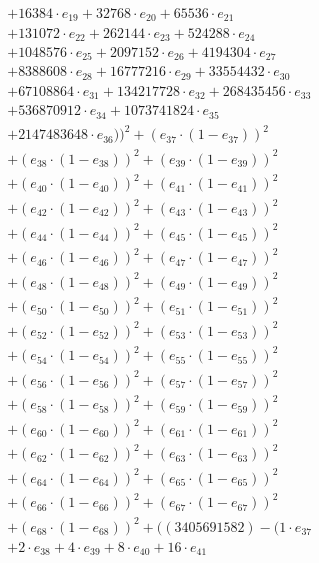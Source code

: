 \documentclass[10pt, a4paper]{article}
\begin{document}
\begin{align*}
& + 16384 \cdot e_{19} + 32768 \cdot e_{20} + 65536 \cdot e_{21} \\
& + 131072 \cdot e_{22} + 262144 \cdot e_{23} + 524288 \cdot e_{24} \\
& + 1048576 \cdot e_{25} + 2097152 \cdot e_{26} + 4194304 \cdot e_{27} \\
& + 8388608 \cdot e_{28} + 16777216 \cdot e_{29} + 33554432 \cdot e_{30} \\
& + 67108864 \cdot e_{31} + 134217728 \cdot e_{32} + 268435456 \cdot e_{33} \\
& + 536870912 \cdot e_{34} + 1073741824 \cdot e_{35} \\
& + 2147483648 \cdot e_{36}))^{2} + (e_{37} \cdot (1 - e_{37}))^{2} \\
& + (e_{38} \cdot (1 - e_{38}))^{2} + (e_{39} \cdot (1 - e_{39}))^{2} \\
& + (e_{40} \cdot (1 - e_{40}))^{2} + (e_{41} \cdot (1 - e_{41}))^{2} \\
& + (e_{42} \cdot (1 - e_{42}))^{2} + (e_{43} \cdot (1 - e_{43}))^{2} \\
& + (e_{44} \cdot (1 - e_{44}))^{2} + (e_{45} \cdot (1 - e_{45}))^{2} \\
& + (e_{46} \cdot (1 - e_{46}))^{2} + (e_{47} \cdot (1 - e_{47}))^{2} \\
& + (e_{48} \cdot (1 - e_{48}))^{2} + (e_{49} \cdot (1 - e_{49}))^{2} \\
& + (e_{50} \cdot (1 - e_{50}))^{2} + (e_{51} \cdot (1 - e_{51}))^{2} \\
& + (e_{52} \cdot (1 - e_{52}))^{2} + (e_{53} \cdot (1 - e_{53}))^{2} \\
& + (e_{54} \cdot (1 - e_{54}))^{2} + (e_{55} \cdot (1 - e_{55}))^{2} \\
& + (e_{56} \cdot (1 - e_{56}))^{2} + (e_{57} \cdot (1 - e_{57}))^{2} \\
& + (e_{58} \cdot (1 - e_{58}))^{2} + (e_{59} \cdot (1 - e_{59}))^{2} \\
& + (e_{60} \cdot (1 - e_{60}))^{2} + (e_{61} \cdot (1 - e_{61}))^{2} \\
& + (e_{62} \cdot (1 - e_{62}))^{2} + (e_{63} \cdot (1 - e_{63}))^{2} \\
& + (e_{64} \cdot (1 - e_{64}))^{2} + (e_{65} \cdot (1 - e_{65}))^{2} \\
& + (e_{66} \cdot (1 - e_{66}))^{2} + (e_{67} \cdot (1 - e_{67}))^{2} \\
& + (e_{68} \cdot (1 - e_{68}))^{2} + ((3405691582) - (1 \cdot e_{37} \\
& + 2 \cdot e_{38} + 4 \cdot e_{39} + 8 \cdot e_{40} + 16 \cdot e_{41} \\

\end{align*}
\end{document}
